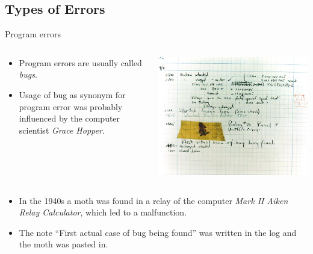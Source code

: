 \subsection{Types of Errors}

\begin{frame}{Program errors}
\begin{minipage}[0.3\textheight]{\textwidth}
	\begin{columns}[T]
		\begin{column}{0.6\textwidth}
			\begin{itemize}
				\item Program errors are usually called \emph{bugs}.
				\item Usage of bug as synonym for program error was probably influenced by the computer scientist \emph{Grace Hopper}.
			\end{itemize}
		\end{column}
		\begin{column}{0.4\textwidth}
			\includegraphics[width=\textwidth]{content/images/software-quality/bug.jpg}
		\end{column}
	\end{columns}
\end{minipage}

\begin{itemize}
	\item In the 1940s a moth was found in a relay of the computer \emph{Mark II Aiken Relay Calculator}, which led to a malfunction.
	\item The note \enquote{First actual case of bug being found} was written in the log and  the moth was pasted in.
\end{itemize}
\end{frame}


